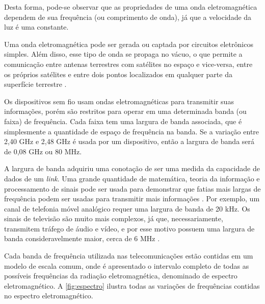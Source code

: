 Desta forma, pode-se observar que as propriedades de uma onda eletromagnética dependem de sua frequência (ou comprimento de onda), já que a velocidade da luz é uma constante.

\begin{figure}[H]
	\centering
\end{figure}

Uma onda eletromagnética pode ser gerada ou captada por circuitos eletrônicos simples. Além disso, esse tipo de onda se propaga no vácuo, o que permite a comunicação entre antenas terrestres com satélites no espaço e vice-versa, entre os próprios satélites e entre dois pontos localizados em qualquer parte da superfície terrestre \cite{fluminense2010}.

Os dispositivos sem fio usam ondas eletromagnéticas para transmitir suas informações, porém são restritos para operar em uma determinada banda (ou faixa) de frequência. Cada faixa tem uma largura de banda associada, que é simplesmente a quantidade de espaço de frequência na banda. Se a variação entre 2,40 GHz e 2,48 GHz é usada por um dispositivo, então a largura de banda será de 0,08 GHz ou 80 MHz.

A largura de banda adquiriu uma conotação de ser uma medida da capacidade de dados de um \textit{link}. Uma grande quantidade de matemática, teoria da informação e processamento de sinais pode ser usada para demonstrar que fatias mais largas de frequência podem ser usadas para transmitir mais informações \cite{gast2002}. Por exemplo, um canal de telefonia móvel analógico requer uma largura de banda de 20 kHz. Os sinais de televisão são muito mais complexos, já que, necessariamente, transmitem tráfego de áudio e vídeo, e por esse motivo possuem uma largura de banda consideravelmente maior, cerca de 6 MHz \cite{gast2002}.

Cada banda de frequência utilizada nas telecomunicações estão contidas em um modelo de escala comum, onde é apresentado o intervalo completo de todas as possíveis frequências da radiação eletromagnética, denominado de espectro eletromagnético. A \autoref{fig:espectro} ilustra todas as variações de frequências contidas no espectro eletromagnético.

